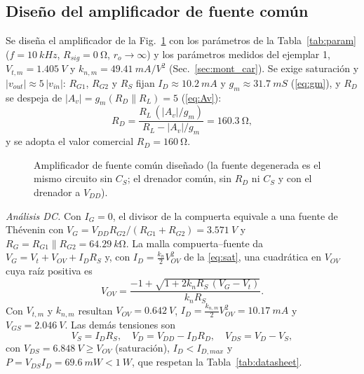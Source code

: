 \documentclass[conference]{IEEEtran}
\newcommand{\gm}{g_m}
\newcommand{\kn}{k_n}
\newcommand{\Vov}{V_{OV}}
\newcommand{\Rsig}{R_{sig}}
\newcommand{\Vtm}{V_{t,m}}
\newcommand{\knm}{k_{n,m}}
\begin{document}
\subsection{Diseño del amplificador de fuente común}
Se diseña el amplificador de la Fig.~\ref{fig:cs} con los parámetros de la Tabla~\ref{tab:param} ($f=\SI{10}{kHz}$, $\Rsig=\SI{0}{\ohm}$, $r_o\rightarrow\infty$) y los parámetros medidos del ejemplar 1, $\Vtm=\SI{1.405}{V}$ y $\knm=\SI{49.41}{mA/V^2}$ (Sec.~\ref{sec:mont_car}). Se exige saturación y $|v_{out}|\approx 5\,|v_{in}|$: $R_{G1}$, $R_{G2}$ y $R_S$ fijan $I_D\approx\SI{10.2}{mA}$ y $\gm\approx\SI{31.7}{mS}$ (\eqref{eq:gm}), y $R_D$ se despeja de $|A_v|=\gm(R_D\parallel R_L)=5$ (\eqref{eq:Av}):
\begin{equation}
R_D=\frac{R_L\,(|A_v|/\gm)}{R_L-|A_v|/\gm}=\SI{160.3}{\ohm},
\label{eq:rd_cs}
\end{equation}
y se adopta el valor comercial $R_D=\SI{160}{\ohm}$.

\begin{figure}[htbp]
\centering
{}
\caption{Amplificador de fuente común diseñado (la fuente degenerada es el mismo circuito sin $C_S$; el drenador común, sin $R_D$ ni $C_S$ y con el drenador a $V_{DD}$).}
\label{fig:cs}
\end{figure}

\noindent\textit{Análisis DC.} Con $I_G=0$, el divisor de la compuerta equivale a una fuente de Thévenin con $V_G=V_{DD}R_{G2}/(R_{G1}+R_{G2})=\SI{3.571}{V}$ y $R_G=R_{G1}\parallel R_{G2}=\SI{64.29}{k\ohm}$. La malla compuerta--fuente da $V_G=V_t+\Vov+I_DR_S$ y, con $I_D=\tfrac{\kn}{2}\Vov^2$ de la \eqref{eq:sat}, una cuadrática en $\Vov$ cuya raíz positiva es
\begin{equation}
\Vov=\frac{-1+\sqrt{1+2\kn R_S\,(V_G-V_t)}}{\kn R_S}.
\label{eq:vov}
\end{equation}
Con $\Vtm$ y $\knm$ resultan $\Vov=\SI{0.642}{V}$, $I_D=\tfrac{\knm}{2}\Vov^2=\SI{10.17}{mA}$ y $V_{GS}=\SI{2.046}{V}$. Las demás tensiones son
\begin{equation}
V_S=I_DR_S,\quad V_D=V_{DD}-I_DR_D,\quad V_{DS}=V_D-V_S,
\label{eq:vds}
\end{equation}
con $V_{DS}=\SI{6.848}{V}\ge\Vov$ (saturación), $I_D<I_{D,max}$ y $P=V_{DS}I_D=\SI{69.6}{mW}<\SI{1}{W}$, que respetan la Tabla~\ref{tab:datasheet}.
\end{document}

